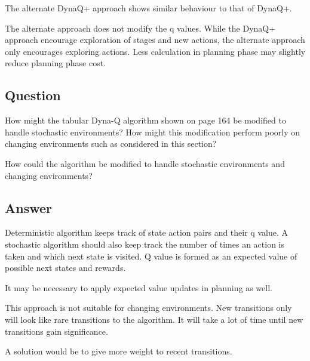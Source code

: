 \documentclass[11pt]{article}
\begin{document}
    The alternate DynaQ+ approach shows similar behaviour to that of DynaQ+.

    The alternate approach does not modify the q values.
    While the DynaQ+ approach encourage exploration of stages and new actions, the alternate approach only encourages exploring actions.
    Less calculation in planning phase may slightly reduce planning phase cost.

    \subsection{Question}

    How might the tabular Dyna-Q algorithm shown on page 164 be modified to handle stochastic environments?
    How might this modification perform poorly on changing environments such as considered in this section?

    How could the algorithm be modified to handle stochastic environments and changing environments?

    \subsection*{Answer}

    Deterministic algorithm keeps track of state action pairs and their q value.
    A stochastic algorithm should also keep track the number of times an action is taken and which next state is visited.
    Q value is formed as an expected value of possible next states and rewards.

    It may be necessary to apply expected value updates in planning as well.

    This approach is not suitable for changing environments.
    New transitions only will look like rare transitions to the algorithm.
    It will take a lot of time until new transitions gain significance.

    A solution would be to give more weight to recent transitions.
\end{document}
